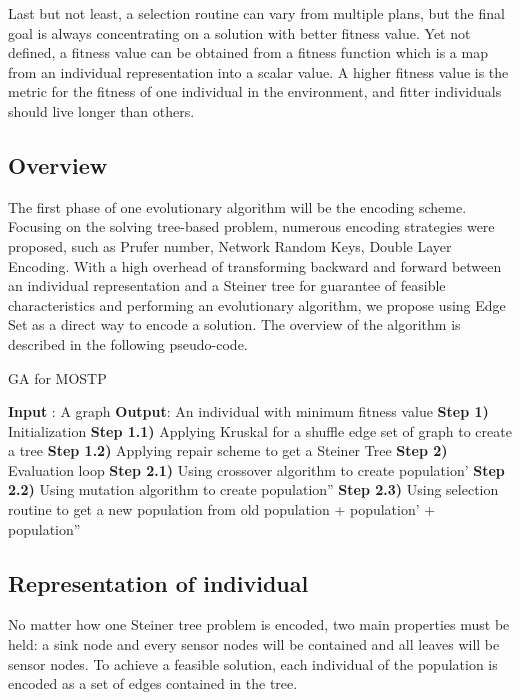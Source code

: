 Last but not least, a selection routine can vary from multiple plans, but the final goal is always concentrating on a solution with better fitness value. Yet not defined, a fitness value can be obtained from a fitness function which is a map from an individual representation into a scalar value. A higher fitness value is the metric for the fitness of one individual in the environment, and fitter individuals should live longer than others.

\subsection{Overview}
The first phase of one evolutionary algorithm will be the encoding scheme. Focusing on the solving tree-based problem, numerous encoding strategies were proposed, such as Prufer number, Network Random Keys, Double Layer Encoding. With a high overhead of transforming backward and forward between an individual representation and a Steiner tree for guarantee of feasible characteristics and performing an evolutionary algorithm, we propose using Edge Set as a direct way to encode a solution. The overview of the algorithm is described in the following pseudo-code.

\begin{algorithm}
\caption{GA for MOSTP}
\begin{algorithmic}[0]
\State \textbf{Input} : A graph
\State \textbf{Output}: An individual with minimum fitness value
\State \textbf{Step 1)} Initialization
		\State \textbf{Step 1.1)} Applying Kruskal for a shuffle edge set of graph to create a tree
		\State \textbf{Step 1.2)} Applying repair scheme to get a Steiner Tree
	\EndFor
\State \textbf{Step 2)} Evaluation loop
		\State \textbf{Step 2.1)} Using crossover algorithm to create population'
		\State \textbf{Step 2.2)} Using mutation algorithm to create population''
		\State \textbf{Step 2.3)} Using selection routine to get a new population from old population + population' + population''
	\EndWhile
\end{algorithmic}
\end{algorithm}

\subsection{Representation of individual}
No matter how one Steiner tree problem is encoded, two main properties must be held: a sink node and every sensor nodes will be contained and all leaves will be sensor nodes. To achieve a feasible solution, each individual of the population is encoded as a set of edges contained in the tree.

